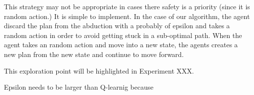 This strategy may not be appropriate in cases there safety is a priority (since it is random action.)
It is simple to implement. 
In the case of our algorithm, the agent discard the plan from the abduction with a probably of epsilon and takes a random action in order to avoid getting stuck in a sub-optimal path. 
When the agent takes an random action and move into a new state, the agents creates a new plan from the new state and continue to move forward.

This exploration point will be highlighted in Experiment XXX.

Epsilon needs to be larger than Q-learnig because